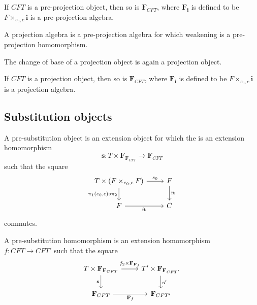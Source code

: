 \begin{lem}
If $CFT$ is a pre-projection object, then so is $\mathbf{F}_{CFT}$, where
$\mathbf{F}_{\mathbf{i}}$ is defined to be $F\times_{e_0,c}\mathbf{i}$ is
a pre-projection algebra.
\end{lem}

\begin{defn}
A projection algebra is a pre-projection algebra for which weakening is a
pre-projection homomorphism.
\end{defn}

\begin{cor}
The change of base of a projection object is again a projection object.
\end{cor}

\begin{cor}
If $CFT$ is a projection object, then so is $\mathbf{F}_{CFT}$, where
$\mathbf{F}_{\mathbf{i}}$ is defined to be $F\times_{e_0,c}\mathbf{i}$ is
a projection algebra.
\end{cor}

\subsection{Substitution objects}

\begin{defn}
A pre-substitution object is an extension object for which the is an
extension homomorphism
\begin{equation*}
\mathbf{s}:T\times\mathbf{F}_{\mathbf{F}_{CFT}}\to \mathbf{F}_{CFT}
\end{equation*}
such that the square
\begin{equation*}
\begin{tikzcd}
T\times(F\times_{e_0,c}F)
  \ar{r}{s_0}
  \ar{d}[swap]{\pi_1(e_0,c)\circ\pi_2}
  &
F \ar{d}{\eft}
  \\
F \ar{r}[swap]{\eft}
  &
C
\end{tikzcd}
\end{equation*}
commutes.
\end{defn}

\begin{defn}
A pre-substitution homomorphism is an extension homomorphism $f:CFT\to CFT'$
such that the square
\begin{equation*}
\begin{tikzcd}
T\times\mathbf{F}_{\mathbf{F}_{CFT}}
  \ar{r}{f_2\times\mathbf{F}_{\mathbf{F}_f}}
  \ar{d}[swap]{\mathbf{s}}
  &
T'\times\mathbf{F}_{\mathbf{F}_{CFT'}}
  \ar{d}{\mathbf{s}'}
  \\
\mathbf{F}_{CFT}
  \ar{r}[swap]{\mathbf{F}_f}
  &
\mathbf{F}_{CFT'}
\end{tikzcd}
\end{equation*}
\end{defn}

